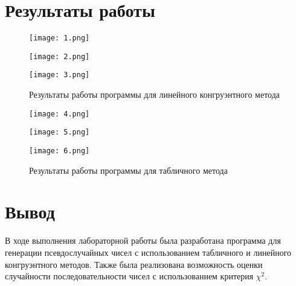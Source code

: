 \section*{Результаты работы}

\begin{figure}[h]
    \begin{minipage}{0.3\textwidth}
        \texttt{[image: 1.png]}
    \end{minipage}
    \hfill
    \begin{minipage}{0.3\textwidth}
        \texttt{[image: 2.png]}
    \end{minipage}
    \hfill
    \begin{minipage}{0.3\textwidth}
        \texttt{[image: 3.png]}
    \end{minipage}
    \caption{Результаты работы программы для линейного конгруэнтного метода}
\end{figure}

\begin{figure}[h]
    \begin{minipage}{0.3\textwidth}
        \texttt{[image: 4.png]}
    \end{minipage}
    \hfill
    \begin{minipage}{0.3\textwidth}
        \texttt{[image: 5.png]}
    \end{minipage}
    \hfill
    \begin{minipage}{0.3\textwidth}
        \texttt{[image: 6.png]}
    \end{minipage}
    \caption{Результаты работы программы для табличного метода}
\end{figure}

\clearpage

\section*{Вывод}

В ходе выполнения лабораторной работы была разработана программа для генерации
псевдослучайных чисел с использованием табличного и линейного конгруэнтного
методов. Также была реализована возможность оценки случайности
последовательности чисел с использованием критерия $\chi^2$.


